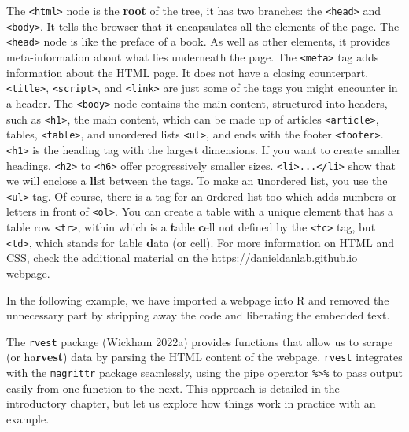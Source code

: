 The \texttt{\textless{}html\textgreater{}} node is the \textbf{root} of
the tree, it has two branches: the \texttt{\textless{}head\textgreater{}}
and \texttt{\textless{}body\textgreater{}}. It tells the browser that it
encapsulates all the  elements of the page. The
\texttt{\textless{}head\textgreater{}} node is like the preface of a book. As well as other elements, it
provides meta-information about what lies underneath the page.
The \texttt{\textless{}meta\textgreater{}} tag adds information about
the HTML page. It does not have a closing counterpart.
\texttt{\textless{}title\textgreater{}},
\texttt{\textless{}script\textgreater{}}, and
\texttt{\textless{}link\textgreater{}} are just some of the tags you might encounter in a header. The \texttt{\textless{}body\textgreater{}} node
contains the main content, structured into headers, such as
\texttt{\textless{}h1\textgreater{}}, the main content, which can be made up of
articles \texttt{\textless{}article\textgreater{}}, tables,
\texttt{\textless{}table\textgreater{}}, and unordered lists
\texttt{\textless{}ul\textgreater{}}, and ends with the footer
\texttt{\textless{}footer\textgreater{}}.
\texttt{\textless{}h1\textgreater{}} is the heading tag with the
largest dimensions. If you want to create smaller headings,
\texttt{\textless{}h2\textgreater{}} to
\texttt{\textless{}h6\textgreater{}} offer progressively smaller sizes.
\texttt{\textless{}li\textgreater{}...\textless{}/li\textgreater{}}
show that we will enclose a \textbf{li}st between the tags. To make an
\textbf{u}nordered \textbf{l}ist, you use the
\texttt{\textless{}ul\textgreater{}} tag. Of course, there is a tag for
an \textbf{o}rdered \textbf{l}ist too which adds numbers or letters in
front of \texttt{\textless{}ol\textgreater{}}. You can create
a table with a unique element that has a table row
\texttt{\textless{}tr\textgreater{}}, within which is a \textbf{t}able
\textbf{c}ell not defined by the
\texttt{\textless{}tc\textgreater{}} tag, but
\texttt{\textless{}td\textgreater{}}, which stands for \textbf{t}able
\textbf{d}ata (or cell). For more information on HTML and CSS, check the
additional material on the https://danieldanlab.github.io webpage.

In the following example, we have imported a webpage into R and removed the
unnecessary part by stripping away the code and liberating the embedded
text.

The \texttt{rvest} package (Wickham 2022a) provides functions that allow
us to scrape (or ha\textbf{rvest}) data by parsing the HTML content of
the webpage. \texttt{rvest} integrates with the
\texttt{magrittr} package seamlessly, using the pipe operator
\texttt{\%\textgreater{}\%} to pass output easily from one function to
the next. This approach is detailed in the introductory chapter, but let us
explore how things work in practice with an example.

